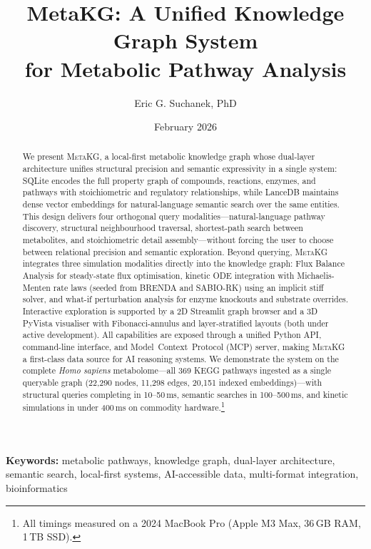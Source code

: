 \documentclass[10pt]{article}
\title{\textbf{MetaKG: A Unified Knowledge Graph System\\for Metabolic Pathway Analysis}}
\author[1]{Eric G. Suchanek, PhD}
\affil[1]{Flux Frontiers, \href{https://github.com/Flux-Frontiers}{github.com/Flux-Frontiers}}
\date{February 2026}
\begin{document}

\maketitle

\begin{abstract}
\noindent
We present \textsc{MetaKG}, a local-first metabolic knowledge graph whose
dual-layer architecture unifies structural precision and semantic expressivity
in a single system: SQLite encodes the full property graph of compounds,
reactions, enzymes, and pathways with stoichiometric and regulatory
relationships, while LanceDB maintains dense vector embeddings for
natural-language semantic search over the same entities. This design delivers
four orthogonal query modalities---natural-language pathway discovery,
structural neighbourhood traversal, shortest-path search between metabolites,
and stoichiometric detail assembly---without forcing the user to choose between
relational precision and semantic exploration. Beyond querying, \textsc{MetaKG}
integrates three simulation modalities directly into the knowledge graph: Flux
Balance Analysis for steady-state flux optimisation, kinetic ODE integration
with Michaelis-Menten rate laws (seeded from BRENDA and SABIO-RK) using an
implicit stiff solver, and what-if perturbation analysis for enzyme knockouts
and substrate overrides. Interactive exploration is supported by a 2D Streamlit
graph browser and a 3D PyVista visualiser with Fibonacci-annulus and
layer-stratified layouts (both under active development). All capabilities are
exposed through a unified Python API, command-line interface, and
Model~Context~Protocol (MCP) server, making \textsc{MetaKG} a first-class data
source for AI reasoning systems. We demonstrate the system on the complete
\textit{Homo sapiens} metabolome---all 369 KEGG pathways ingested as a single
queryable graph (22,290 nodes, 11,298 edges, 20,151 indexed embeddings)---with
structural queries completing in 10--50\,ms, semantic searches in
100--500\,ms, and kinetic simulations in under 400\,ms on commodity
hardware.\footnote{All timings measured on a 2024 MacBook Pro (Apple M3
Max, 36\,GB RAM, 1\,TB SSD).}
\end{abstract}

\textbf{Keywords:} metabolic pathways, knowledge graph, dual-layer architecture,
semantic search, local-first systems, AI-accessible data, multi-format integration,
bioinformatics
\end{document}
